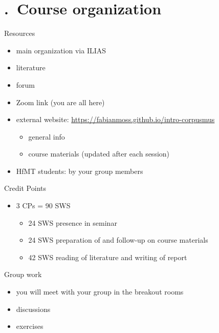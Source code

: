 \section{\thesection.~Course organization}

\begin{frame}{Resources}
    \begin{itemize}
      \item main organization via ILIAS
      \item literature
      \item forum
      \item Zoom link (you are all here)
      \item external website: \url{https://fabianmoss.github.io/intro-corpusmus}
      \begin{itemize}
        \item general info
        \item course materials (updated after each session)
      \end{itemize}
      \item HfMT students: by your group members
    \end{itemize}
  \end{frame}
  
  \begin{frame}{Credit Points}
    \begin{itemize}
      \item 3 CPs = 90 SWS
      \begin{itemize}
        \item 24 SWS presence in seminar
        \item 24 SWS preparation of and follow-up on course materials
        \item 42 SWS reading of literature and writing of report
      \end{itemize}
    \end{itemize}
  \end{frame}
  
  \begin{frame}{Group work}
    \begin{itemize}
      \item you will meet with your group in the breakout rooms
      \item discussions
      \item exercises
    \end{itemize}
  \end{frame}
  
